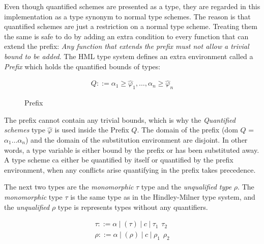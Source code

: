 \documentclass[twoside, titlepage, openright, a4paper]{book}
\renewcommand{\geq}{\geqslant}
\begin{document}
Even though quantified schemes are presented as a type, they are regarded in this implementation as a type synonym to normal type schemes. The reason is that quantified schemes are just a restriction on a normal type scheme. Treating them the same is safe to do by adding an extra condition to every function that can extend the prefix: \emph{Any function that extends the prefix must not allow a trivial bound to be added}.
The HML type system defines an extra environment called a \emph{Prefix} which holds the quantified bounds of types:

\begin{figure}[H]
\begin{eqnarray*}
Q ::= \alpha_1\geq\hat{\varphi}_1,\ldots,\alpha_n\geq\hat{\varphi}_n
\end{eqnarray*}
\caption{Prefix}
\label{Prefix}
\end{figure}

The prefix cannot contain any trivial bounds, which is why the \emph{Quantified schemes} type $\hat{\varphi}$ is used inside the Prefix $Q$. The domain of the prefix (dom $Q$ = ${\alpha_1 \ldots \alpha_n}$) and the domain of the substitution environment are disjoint. In other words, a type variable is either bound by the prefix or has been substituted away. A type scheme ca either be quantified by itself or quantified by the prefix environment, when any conflicts arise quantifying in the prefix takes precedence.

The next two types are the \emph{monomorphic} $\tau$ type and the \emph{unqualified type} $\rho$. The \emph{monomorphic} type $\tau$ is the same type as in the Hindley-Milner type system, and the \emph{unqualified} $\rho$ type is represents types without any quantifiers. 

\begin{eqnarray*}
\tau  ::= \alpha \hspace{3pt} | \hspace{3pt} (\tau) \hspace{3pt} | \hspace{3pt} c \hspace{3pt} | \hspace{3pt} \tau_1 \hspace{5pt} \tau_2 \\
\rho  ::= \alpha \hspace{3pt} | \hspace{3pt} (\rho) \hspace{3pt} | \hspace{3pt} c \hspace{3pt} | \hspace{3pt} \rho_1 \hspace{5pt} \rho_2
\end{eqnarray*}
\end{document}
